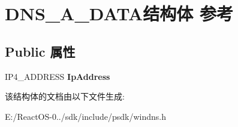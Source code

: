 \hypertarget{struct_d_n_s___a___d_a_t_a}{}\section{D\+N\+S\+\_\+\+A\+\_\+\+D\+A\+T\+A结构体 参考}
\label{struct_d_n_s___a___d_a_t_a}
\subsection*{Public 属性}
\begin{DoxyCompactItemize}
\item 
\mbox{\label{struct_d_n_s___a___d_a_t_a_ad3aff4e0ebd5445c06ac40e37c258ef6}} 
I\+P4\+\_\+\+A\+D\+D\+R\+E\+SS {\bfseries Ip\+Address}
\end{DoxyCompactItemize}


该结构体的文档由以下文件生成\+:\begin{DoxyCompactItemize}
\item 
E\+:/\+React\+O\+S-\/0../sdk/include/psdk/windns.\+h\end{DoxyCompactItemize}
